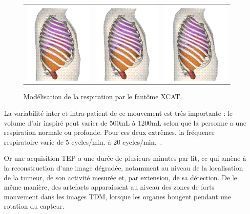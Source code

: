 \begin{figure}[h!]
\begin{center}
\begin{tabular}{c c c}
	\includegraphics[width=4cm]{images/resp7} & \includegraphics[width=4cm]{images/resp9} & \includegraphics[width=4cm]{images/resp11}\\
	\end{tabular}
    \end{center}
    \caption{Modélisation de la respiration par le fantôme XCAT.}
    \label{fig:respiXCAT}
\end{figure}

La variabilité inter et intra-patient de ce mouvement est très importante : le volume d'air inspiré peut varier de 500mL à 1200mL selon que la personne a une respiration normale ou profonde. Pour ces deux extrêmes, la fréquence respiratoire varie de 5 cycles/min. à 20 cycles/min.~\cite{sherwood2006fundamentals}.

Or une acquisition TEP a une durée de plusieurs minutes par lit, ce qui amène à la reconstruction d'une image dégradée, notamment au niveau de la localisation de la tumeur, de son activité mesurée et, par extension, de sa détection. De le même manière, des artefacts apparaissent au niveau des zones de forts mouvement dans les images TDM, lorsque les organes bougent pendant une rotation du capteur.

